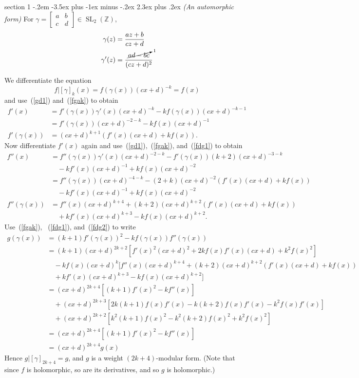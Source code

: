\documentclass[12pt]{article}
\makeatletter
\theoremstyle{norm}
\newcommand{\Z}[0]{\mathbb{Z}}
\newcommand{\ga}[0]{\gamma}
\newcommand{\ba}[1]{\left[ {#1} \right]}
\newcommand{\SL}{\operatorname{SL}}
\newcommand{\matt}[4]{
\left[
\begin{matrix}
{#1}&{#2}\\
{#3}&{#4}
\end{matrix}
\right]}
\newenvironment{problem}{\@startsection
       {section}
       {1}
       {-.2em}
       {-3.5ex plus -1ex minus -.2ex}
       {2.3ex plus .2ex}
       {\pagebreak[3]%
       \large\bf\noindent{Problem }
       }
       }
       {%
       }
\makeatother
\begin{document}
\begin{problem} {\it (An automorphic form)}
For $\ga=\matt abcd\in \SL_2(\Z)$,
\begin{align}
\nonumber  \ga(z)&=\frac{az+b}{cz+d}\\
\label{gd1}
\ga'(z)&=\frac{\cancelto{1}{ad-bc}}{(cz+d)^2}
\end{align}

We differentiate the equation 
\begin{equation}\label{fgak}
f|[\ga]_k(x)=f(\ga(x))(cx+d)^{-k}=f(x)
\end{equation}
and use~(\ref{gd1}) and~(\ref{fgak}) to obtain
\begin{align}
\nonumber f'(x)&=f'(\ga(x))\ga'(x)(cx+d)^{-k}-kf(\ga(x))(cx+d)^{-k-1}\\
 &=f'(\ga(x))(cx+d)^{-2-k}-kf(x)(cx+d)^{-1}
\label{fd1}\\
\label{fdg1} f'(\ga(x))&=(cx+d)^{k+1}(f'(x)(cx+d)+kf(x)).
\end{align}
Now differentiate $f'(x)$ again and use~(\ref{gd1}),~(\ref{fgak}), and~(\ref{fdg1}) to obtain
\begin{align}
\nonumber f''(x)&=f''(\ga(x))\ga'(x)(cx+d)^{-2-k}-f'(\ga(x))(k+2)(cx+d)^{-3-k}\\
\nonumber &\quad -kf'(x)(cx+d)^{-1}+kf(x)(cx+d)^{-2}\\
\nonumber &= f''(\ga(x))(cx+d)^{-4-k}-(2+k)(cx+d)^{-2}(f'(x)(cx+d)+kf(x))\\
\nonumber &\quad -kf'(x)(cx+d)^{-1}+kf(x)(cx+d)^{-2}\\
\nonumber
f''(\ga(x))&=f''(x)(cx+d)^{k+4}+(k+2)(cx+d)^{k+2}(f'(x)(cx+d)+kf(x))\\
&\quad +kf'(x)(cx+d)^{k+3}-kf(x)(cx+d)^{k+2}.\label{fdg2}
\end{align}
Use~(\ref{fgak}), ~(\ref{fdg1}), and~(\ref{fdg2}) to write
\begin{align*}
g(\ga(x))&=(k+1)f'(\ga(x))^2-kf(\ga(x))f''(\ga(x))\\
&=(k+1)(cx+d)^{2k+2}\ba{
f'(x)^2(cx+d)^2+2kf(x)f'(x)(cx+d)+k^2f(x)^2
}\\
&\quad-kf(x)(cx+d)^k
[
f''(x)(cx+d)^{k+4}+(k+2)(cx+d)^{k+2}(f'(x)(cx+d)+kf(x))\\
&\quad
+kf'(x)(cx+d)^{k+3}-kf(x)(cx+d)^{k+2}
]\\
&=(cx+d)^{2k+4}\ba{(k+1)f'(x)^2-kf''(x)}\\
&\quad +(cx+d)^{2k+3}\ba{
2k(k+1)f(x)f'(x)-k(k+2)f(x)f'(x)-k^2f(x)f'(x)}\\
&\quad +(cx+d)^{2k+2}\ba{
k^2(k+1)f(x)^2-k^2(k+2)f(x)^2+k^2f(x)^2
}\\
&=(cx+d)^{2k+4} [(k+1)f'(x)^2-kf''(x)]\\
&=(cx+d)^{2k+4} g(x)
\end{align*}
Hence $g|[\ga]_{2k+4}=g$, and $g$ is a weight $(2k+4)$-modular form. (Note that since $f$ is holomorphic, so are its derivatives, and so $g$ is holomorphic.)


\end{problem}
\end{document}
